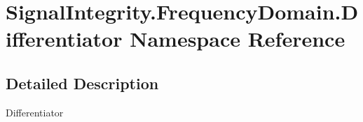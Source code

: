 \hypertarget{namespaceSignalIntegrity_1_1FrequencyDomain_1_1Differentiator}{}\section{Signal\+Integrity.\+Frequency\+Domain.\+Differentiator Namespace Reference}
\label{namespaceSignalIntegrity_1_1FrequencyDomain_1_1Differentiator}


\subsection{Detailed Description}
\begin{DoxyVerb}Differentiator\end{DoxyVerb}
 